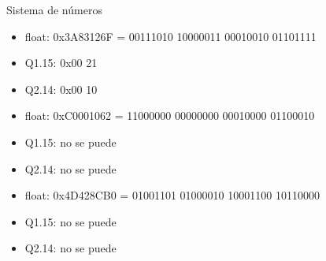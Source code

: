\begin{frame}{Sistema de números}
{      \begin{itemize}
           0.001
        \item{float: 0x3A83126F = 00111010 10000011 00010010 01101111}
        \item{Q1.15: 0x00 21}
        \item{Q2.14: 0x00 10}
      \end{itemize}
      \begin{itemize}
           -2.001
        \item{float: 0xC0001062 = 11000000 00000000 00010000 01100010}
        \item{Q1.15: no se puede}
        \item{Q2.14: no se puede}
      \end{itemize}
      \begin{itemize}
             204000000
        \item{float: 0x4D428CB0 = 01001101 01000010 10001100 10110000}
        \item{Q1.15: no se puede}
        \item{Q2.14: no se puede}
      \end{itemize}

   }
 \end{frame}
